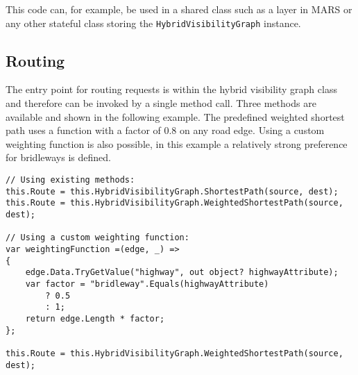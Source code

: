 		\noindent
		This code can, for example, be used in a shared class such as a layer in MARS or any other stateful class storing the \texttt{HybridVisibilityGraph} instance.
		
	\subsection*{Routing}
	
		The entry point for routing requests is within the hybrid visibility graph class and therefore can be invoked by a single method call.
		Three methods are available and shown in the following example.
		The predefined weighted shortest path uses a function with a factor of 0.8 on any road edge.
		Using a custom weighting function is also possible, in this example a relatively strong preference for bridleways is defined.
	
		\begin{verbatim}
// Using existing methods:
this.Route = this.HybridVisibilityGraph.ShortestPath(source, dest);
this.Route = this.HybridVisibilityGraph.WeightedShortestPath(source, dest);

// Using a custom weighting function:
var weightingFunction =(edge, _) =>
{
	edge.Data.TryGetValue("highway", out object? highwayAttribute);
	var factor = "bridleway".Equals(highwayAttribute)
		? 0.5
		: 1;
	return edge.Length * factor;
};

this.Route = this.HybridVisibilityGraph.WeightedShortestPath(source, dest);
		\end{verbatim}